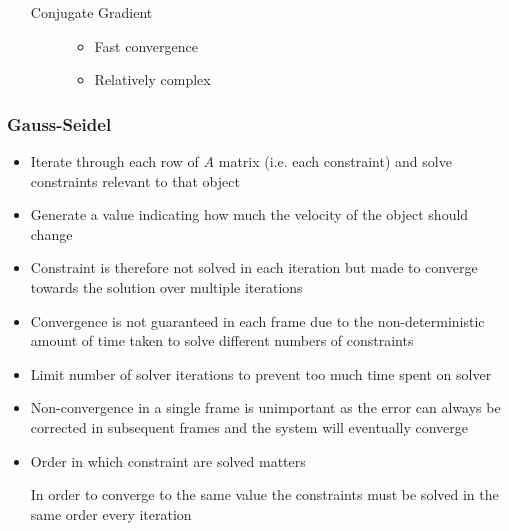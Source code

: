 \documentclass[a4paper]{article}
\begin{document}
\begin{itemize}
\begin{description}
\begin{itemize}
        \end{itemize}

      \item[Conjugate Gradient] \hfill
        \begin{itemize}
          \item
            Fast convergence

          \item
            Relatively complex

        \end{itemize}

    \end{description}

\end{itemize}

\subsubsection{Gauss-Seidel}

\begin{itemize}
  \item
    Iterate through each row of $A$ matrix (i.e. each constraint) and solve
    constraints relevant to that object

  \item
    Generate a value indicating how much the velocity of the object should
    change

  \item
    Constraint is therefore not solved in each iteration but made to converge
    towards the solution over multiple iterations

  \item
    Convergence is not guaranteed in each frame due to the non-deterministic
    amount of time taken to solve different numbers of constraints

  \item
    Limit number of solver iterations to prevent too much time spent on solver

  \item
    Non-convergence in a single frame is unimportant as the error can always be
    corrected in subsequent frames and the system will eventually converge

  \item
    Order in which constraint are solved matters

    In order to converge to the same value the constraints must be solved in the
    same order every iteration

\end{itemize}
\end{document}
